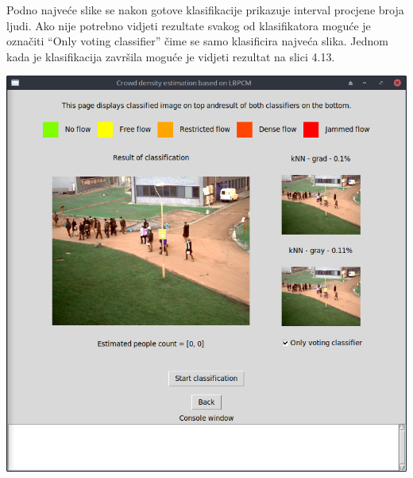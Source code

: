\documentclass[times, utf8, zavrsni]{fer}
\begin{document}
\bigbreak

Podno najveće slike se nakon gotove klasifikacije prikazuje interval
procjene broja ljudi. Ako nije potrebno vidjeti rezultate svakog od
klasifikatora moguće je označiti  \enquote{Only voting classifier}
čime se samo klasificira najveća slika. Jednom kada je klasifikacija 
završila moguće je vidjeti rezultat na slici 4.13.

\bigbreak

\begin{minipage}{\linewidth}
\centering
\includegraphics[scale=0.38]{img/cl3.png}
\end{minipage}

\bigbreak
\end{document}
